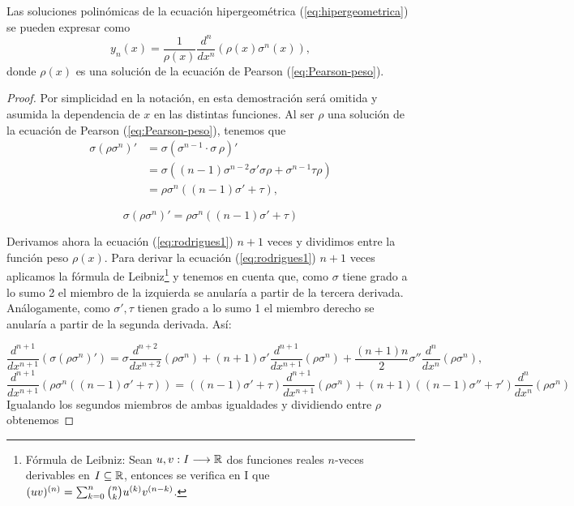 \begin{teorema}
    \label{th:formula-rodrigues}
    Las soluciones polinómicas de la ecuación hipergeométrica (\ref{eq:hipergeometrica}) se pueden expresar como
    \begin{equation}
        \label{eq:formula-rodrigues}
        y_n(x) = \dfrac 1 {\rho(x)} \dfrac{d^n}{dx^n} (\rho(x) \sigma^n(x)),
    \end{equation}
    donde $\rho(x)$ es una solución de la ecuación de Pearson (\ref{eq:Pearson-peso}).
\end{teorema}
\begin{proof}
    Por simplicidad en la notación, en esta demostración será omitida y asumida la dependencia de $x$ en las distintas funciones.
    Al ser $\rho$ una solución de la ecuación de Pearson (\ref{eq:Pearson-peso}), tenemos que
    \begin{equation*}
        \begin{split}
            \sigma(\rho \sigma^n)' &= \sigma (\sigma^{n-1}\cdot \sigma \, \rho )' \\
            &= \sigma ((n-1)\sigma^{n-2}\sigma'\sigma\rho + \sigma^{n-1}\tau\rho) \\
            &= \rho \sigma^n ((n-1)\sigma'+\tau),
        \end{split}
    \end{equation*}

    \begin{equation}
        \label{eq:rodrigues1}
        \sigma(\rho \sigma^n)'=\rho \sigma^n ((n-1)\sigma'+\tau)
    \end{equation}

    Derivamos ahora la ecuación (\ref{eq:rodrigues1}) $n+1$ veces y dividimos entre la función peso $\rho(x)$. Para derivar la ecuación (\ref{eq:rodrigues1}) $n+1$ veces aplicamos la fórmula de Leibniz\footnote{Fórmula de Leibniz: Sean $u,v:I\longrightarrow\mathbb{R}$ dos funciones reales $n$-veces derivables en $I\subseteq\mathbb{R}$, entonces se verifica en I que $(uv)^{(n)}=\nolinebreak\sum_{k=0}^n \binom{n}{k} u^{(k)}v^{(n-k)}$.} y tenemos en cuenta que, como $\sigma$ tiene grado a lo sumo 2 el miembro de la izquierda se anularía a partir de la tercera derivada. Análogamente, como $\sigma',\tau$ tienen grado a lo sumo 1 el miembro derecho se anularía a partir de la segunda derivada. Así:

    $$
    \frac{d^{n+1}}{d x^{n+1}}\left(\sigma(\rho \sigma^n)'\right)= \sigma \frac{d^{n+2}}{d x^{n+2}} \left(\rho\sigma^n\right) + (n+1)\sigma'\frac{d^{n+1}}{d x^{n+1}} \left(\rho\sigma^n \right) + \frac{(n+1)n}{2}\sigma''\frac{d^{n}}{d x^{n}} \left(\rho\sigma^n \right),
    $$
    $$
    \frac{d^{n+1}}{d x^{n+1}}\left(\rho \sigma^n ((n-1)\sigma'+\tau)\right) = ((n-1)\sigma'+\tau)\frac{d^{n+1}}{d x^{n+1}}\left(\rho\sigma^n \right) + (n+1)\left((n-1)\sigma'' + \tau'\right)\frac{d^{n}}{d x^{n}}\left(\rho\sigma^n \right)
    $$
    Igualando los segundos miembros de ambas igualdades y dividiendo entre $\rho$ obtenemos


\end{proof}

